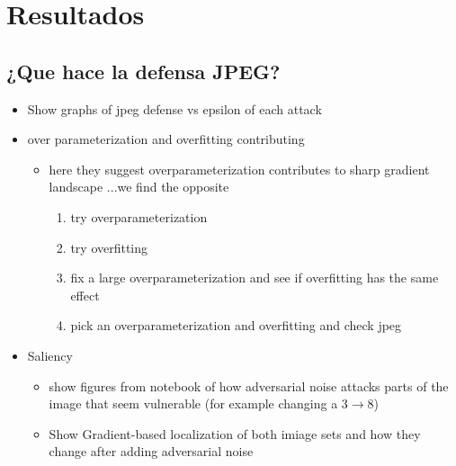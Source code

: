 \section{Resultados}
\subsection{¿Que hace la defensa JPEG?}
\begin{itemize}
    \item Show graphs of jpeg defense vs epsilon of each attack 
    \item over parameterization and overfitting contributing
    \begin{itemize}
        \item here they suggest overparameterization contributes to sharp gradient landscape \cite{ma2020understanding}...we find the opposite
        \begin{enumerate}
            \item try overparameterization
            \item try overfitting 
            \item fix a large overparameterization and see if overfitting has the same effect
            \item pick an overparameterization and overfitting and check jpeg
        \end{enumerate}
    \end{itemize}
    \item Saliency
    \begin{itemize}
        \item show figures from notebook of how adversarial noise attacks parts of the image that seem vulnerable (for example changing a 3$\to$8)
        \item Show Gradient-based localization of both imiage sets and how they change after adding adversarial noise\cite{Selvaraju_2019}
    \end{itemize}
\end{itemize}